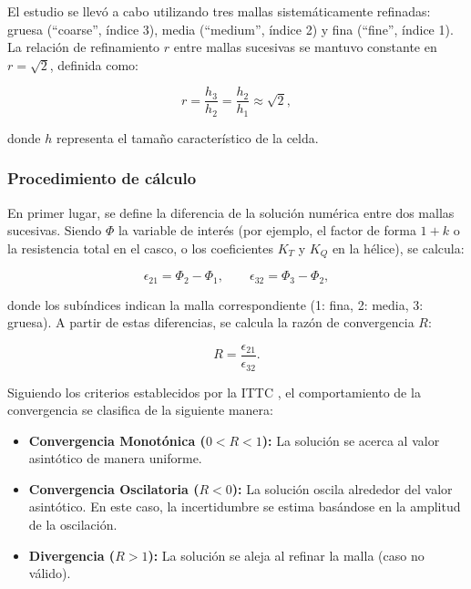 El estudio se llevó a cabo utilizando tres mallas sistemáticamente refinadas: gruesa (``coarse'', índice 3), media (``medium'', índice 2) y fina (``fine'', índice 1). La relación de refinamiento $r$ entre mallas sucesivas se mantuvo constante en $r = \sqrt{2}$, definida como:

\begin{equation}
r = \frac{h_{3}}{h_{2}} = \frac{h_{2}}{h_{1}} \approx \sqrt{2},
\end{equation}

donde $h$ representa el tamaño característico de la celda.

\subsubsection{Procedimiento de cálculo}

En primer lugar, se define la diferencia de la solución numérica entre dos mallas sucesivas. Siendo $\Phi$ la variable de interés (por ejemplo, el factor de forma $1+k$ o la resistencia total en el casco, o los coeficientes $K_T$ y $K_Q$ en la hélice), se calcula:

\begin{equation}
    \epsilon_{21} = \Phi_{2} - \Phi_{1}, \qquad \epsilon_{32} = \Phi_{3} - \Phi_{2},
\end{equation}

donde los subíndices indican la malla correspondiente (1: fina, 2: media,
3: gruesa). A partir de estas diferencias, se calcula la razón de
convergencia $R$:

\begin{equation}
    R = \frac{\epsilon_{21}}{\epsilon_{32}}.
\end{equation}

Siguiendo los criterios establecidos por la ITTC \citep{ITTC_uncertainty_CFD}, el comportamiento de la convergencia se clasifica de la siguiente manera:
\begin{itemize}
    \item \textbf{Convergencia Monotónica ($0 < R < 1$):} La solución se acerca al valor asintótico de manera uniforme.
    \item \textbf{Convergencia Oscilatoria ($R < 0$):} La solución oscila alrededor del valor asintótico. En este caso, la incertidumbre se estima basándose en la amplitud de la oscilación.
    \item \textbf{Divergencia ($R > 1$):} La solución se aleja al refinar la malla (caso no válido).
\end{itemize}

